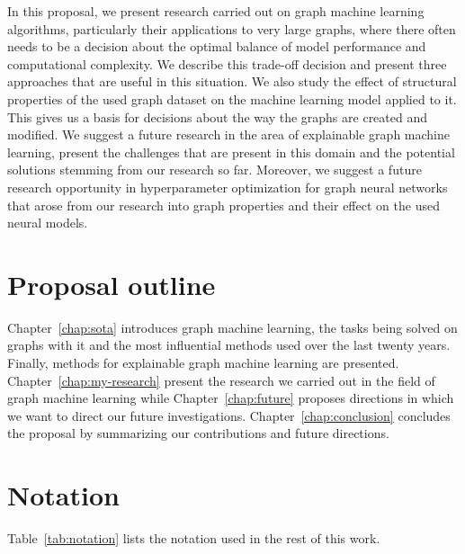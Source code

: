 In this proposal, we present research carried out on graph machine learning algorithms, particularly their applications to very large graphs, where there often needs to be a decision about the optimal balance of model performance and computational complexity. We describe this trade-off decision and present three approaches that are useful in this situation. We also study the effect of structural properties of the used graph dataset on the machine learning model applied to it. This gives us a basis for decisions about the way the graphs are created and modified. We suggest a future research in the area of explainable graph machine learning, present the challenges that are present in this domain and the potential solutions stemming from our research so far. Moreover, we suggest a future research opportunity in hyperparameter optimization for graph neural networks that arose from our research into graph properties and their effect on the used neural models.

\section{Proposal outline}

Chapter~\ref{chap:sota} introduces graph machine learning, the tasks being solved on graphs with it and the most influential methods used over the last twenty years. Finally, methods for explainable graph machine learning are presented. Chapter~\ref{chap:my-research} present the research we carried out in the field of graph machine learning while Chapter~\ref{chap:future} proposes directions in which we want to direct our future investigations. Chapter~\ref{chap:conclusion} concludes the proposal by summarizing our contributions and future directions.

\section{Notation}

Table~\ref{tab:notation} lists the notation used in the rest of this work. 

